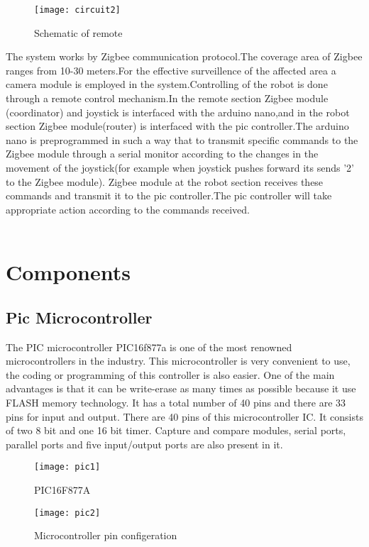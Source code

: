 \documentclass[12pt,a4paper]{report}
\begin{document}
\begin{figure}[h!]
\centering
\texttt{[image: circuit2]}
\caption{Schematic of remote}
\label{circuit}
\end{figure}
\hspace*{1cm}The system works by Zigbee communication protocol.The coverage area of Zigbee ranges from 10-30 meters.For the effective surveillence of the affected area a camera module is employed in the system.Controlling of the robot is done through a remote control mechanism.In the remote section Zigbee module (coordinator) and joystick is interfaced with the arduino nano,and in the robot section Zigbee module(router) is interfaced with the pic controller.The arduino nano is preprogrammed in such a way that to transmit specific commands to the Zigbee module through a serial monitor  according to the changes in the movement of the joystick(for example when joystick pushes forward its sends '2' to the Zigbee module). Zigbee module at the robot section receives these commands and transmit it to the pic controller.The pic controller will take appropriate action according to the commands received.\\\\
\newpage
\section{Components}
\subsection{Pic Microcontroller}
\hspace*{1cm}The PIC microcontroller PIC16f877a is one of the most renowned microcontrollers in the industry. This microcontroller is very convenient to use, the coding or programming of this controller is also easier. One of the main advantages is that it can be write-erase as many times as possible because it use FLASH memory technology. It has a total number of 40 pins and there are 33 pins for input and output. 
There are 40 pins of this microcontroller IC. It consists of two 8 bit and one 16 bit timer. Capture and compare modules, serial ports, parallel ports and five input/output ports are also present in it.

\begin{figure}[h!]
\centering
\texttt{[image: pic1]}
\caption{PIC16F877A}
\label{circuit}
\end{figure}


\begin{figure}[h!]
\centering
\texttt{[image: pic2]}
\caption{Microcontroller pin configeration}
\label{circuit}
\end{figure}
\newpage
\end{document}

